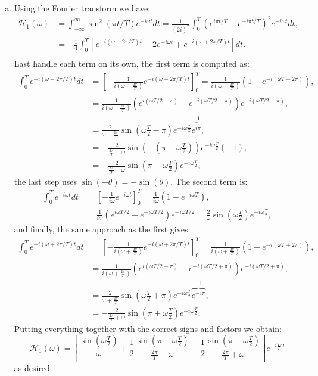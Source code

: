 \begin{enumerate}
\begin{enumerate}[a)]
\item Using the Fourier transform we have:
\begin{align*}
    \mathcal{H}_{1}(\omega)&=\int_{-\infty}^{\infty}\sin^{2}(\pi t/T)e^{-i\omega t}dt=\frac{1}{(2i)^{2}}\int_{0}^{T}\left(e^{i \pi t/T}-e^{-i\pi t/T}\right)^{2}e^{-i\omega t}dt, \\
    &=-\frac{1}{4}\int_{0}^{T}\left[e^{-i(\omega -2\pi/T)t}-2e^{-i\omega t}+e^{-i(\omega + 2\pi/T)t}\right]dt. \\
\end{align*}
Last handle each term on its own, the first term is computed as:
\begin{align*}
    \int_{0}^{T}e^{-i(\omega-2\pi/T)t}dt&=\left[-\frac{1}{i(\omega-\frac{2\pi}{T})}e^{-i(\omega-2\pi/T)t}\right]_{0}^{T}=\frac{1}{i(\omega-\frac{2\pi}{T})}(1-e^{-i(\omega T-2\pi)}), \\
    &=\frac{1}{i(\omega-\frac{2\pi}{T})}(e^{i(\omega T/2-\pi)}-e^{-i(\omega T/2-\pi)})e^{-i(\omega T/2-\pi)}, \\
    &=\frac{2}{\omega-\frac{2\pi}{T}}\sin\left(\omega\frac{T}{2}-\pi\right)e^{-i\omega\frac{T}{2}}\overbrace{e^{i\pi}}^{-1}, \\
    &=-\frac{2}{\frac{2\pi}{T}-\omega}\sin\left(-\left(\pi-\omega\frac{T}{2}\right)\right)e^{-i\omega\frac{T}{2}}(-1), \\
    &=-\frac{2}{\frac{2\pi}{T}-\omega}\sin\left(\pi-\omega\frac{T}{2}\right)e^{-i\omega\frac{T}{2}},
\end{align*}
the last step uses $\sin(-\theta)=-\sin(\theta)$. The second term is:
\begin{align*}
    \int_{0}^{T}e^{-i\omega t}dt&=\left[-\frac{1}{i\omega}e^{-i\omega t}\right]_{0}^{T}=\frac{1}{i\omega}(1-e^{-i\omega T}), \\
    &=\frac{1}{i\omega}(e^{i\omega T/2}-e^{-i\omega T/2})e^{-i\omega T/2}=\frac{2}{\omega}\sin\left(\omega\frac{T }{2}\right)e^{-i\omega\frac{T}{2}},
\end{align*}
and finally, the same approach as the first gives:
\begin{align*}
    \int_{0}^{T}e^{-i(\omega+2\pi/T)t}dt&=\left[-\frac{1}{i(\omega+\frac{2\pi}{T})}e^{-i(\omega+2\pi/T)t}\right]_{0}^{T}=\frac{1}{i(\omega+\frac{2\pi}{T})}(1-e^{-i(\omega T + 2\pi)}), \\
    &=\frac{1}{i(\omega+\frac{2\pi}{T})}(e^{i(\omega T/2+\pi)}-e^{-i(\omega T/2+\pi)})e^{-i(\omega T/2+\pi)}, \\
    &=\frac{2}{\omega+\frac{2\pi}{T}}\sin\left(\omega\frac{T}{2}+\pi\right)e^{-i\omega\frac{T}{2}}\overbrace{e^{-i\pi}}^{-1}, \\
    &=-\frac{2}{\frac{2\pi}{T}+\omega}\sin\left(\pi+\omega\frac{T}{2}\right)e^{-i\omega\frac{T}{2}}.
\end{align*}
Putting everything together with the correct signs and factors we obtain:
$$\mathcal{H}_{1}(\omega)=\left[\frac{\sin\left(\omega\frac{T }{2}\right)}{\omega}+\frac{1}{2}\frac{\sin\left(\pi-\omega\frac{T}{2}\right)}{\frac{2\pi}{T}-\omega}+\frac{1}{2}\frac{\sin\left(\pi+\omega\frac{T}{2}\right)}{\frac{2\pi}{T}+\omega}\right]e^{-i\frac{T}{2}\omega}$$
as desired.


\end{enumerate}
\end{enumerate}
